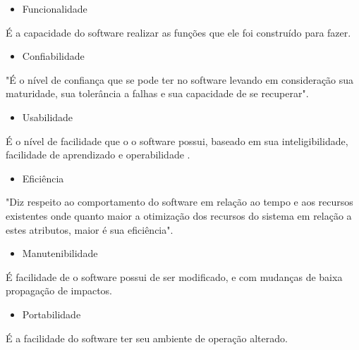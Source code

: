 \begin{itemize}
\item Funcionalidade
\end{itemize} 
É a capacidade do software realizar as funções que ele foi construído para fazer.
\begin{itemize}
\item Confiabilidade
\end{itemize}
"É o nível de confiança que se pode ter no software 
levando  em  consideração  sua  maturidade,  sua  tolerância  a  falhas  e  sua 
capacidade de se recuperar"\space \cite[p.~28]{isaias2012}. 
\begin{itemize}
\item Usabilidade
\end{itemize}
É o nível de facilidade que o o software possui, baseado em sua inteligibilidade, facilidade de aprendizado e operabilidade \cite{isaias2012}.
\begin{itemize}
\item Eficiência
\end{itemize}
"Diz respeito ao comportamento do software em relação ao tempo e aos recursos existentes onde quanto maior a otimização dos recursos do sistema em relação a estes atributos, maior é sua eficiência"\space\cite[p.~28]{isaias2012}.
\begin{itemize}
\item Manutenibilidade
\end{itemize}
É facilidade de o software possui de ser modificado, e com mudanças de baixa propagação de impactos.
\begin{itemize}
\item Portabilidade
\end{itemize}
É a facilidade do software ter seu ambiente de operação alterado.


